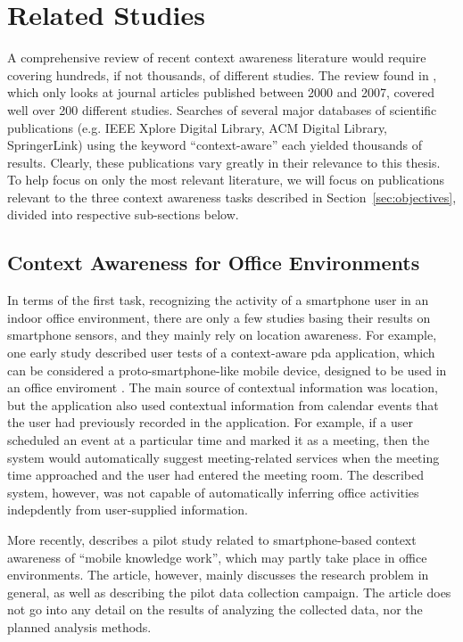 \section{Related Studies}
\label{sec:literature}

A comprehensive review of recent context awareness literature would require covering hundreds, if not thousands, of different studies. The review found in \cite{Hong2009}, which only looks at journal articles published between 2000 and 2007, covered well over 200 different studies.  Searches of several major databases of scientific publications (e.g. IEEE Xplore Digital Library, ACM Digital Library, SpringerLink) using the keyword ``context-aware'' each yielded thousands of results. Clearly, these publications vary greatly in their relevance to this thesis. To help focus on only the most relevant literature, we will focus on publications relevant to the three context awareness tasks described in Section~\ref{sec:objectives}, divided into respective sub-sections below.

\subsection{Context Awareness for Office Environments}
\label{sec:office-literature}

In terms of the first task, recognizing the activity of a smartphone user in an indoor office environment, there are only a few studies basing their results on smartphone sensors, and they mainly rely on location awareness. For example, one early study described user tests of a context-aware \gls{pda} application, which can be considered a proto-smartphone-like mobile device, designed to be used in an office enviroment \cite{Tahti2004}. The main source of contextual information was location, but the application also used contextual information from calendar events that the user had previously recorded in the application. For example, if a user scheduled an event at a particular time and marked it as a meeting, then the system would automatically suggest meeting-related services when the meeting time approached and the user had entered the meeting room. The described system, however, was not capable of automatically inferring office activities indepdently from user-supplied information.

More recently, \cite{heiskala2014research} describes a pilot study related to smartphone-based context awareness of ``mobile knowledge work'', which may partly take place in office environments. The article, however, mainly discusses the research problem in general, as well as describing the pilot data collection campaign. The article does not go into any detail on the results of analyzing the collected data, nor the planned analysis methods.

